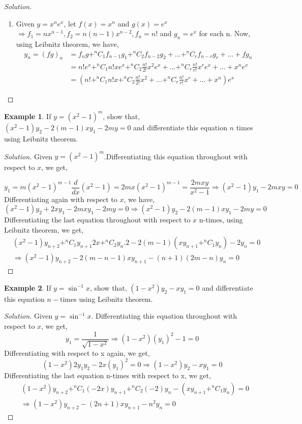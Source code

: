 \documentclass[../../main.tex]{subfiles}
\theoremstyle{definition}
\newtheorem{example}{Example}[section]
\newenvironment{solution}
    {\begin{proof}[Solution]}
    {\end{proof}}
\begin{document}
\begin{solution}
\begin{enumerate}[label=(\roman*)]
\item Given $y=x^ne^x$, let $f(x)=x^n$ and $g(x)=e^x$ $\Rightarrow f_1=nx^{n-1}, f_2=n(n-1)x^{n-2}, f_n=n!$ and $g_n=e^x$ for each n. Now, using Leibnitz theorem, we have,
\begin{align*}
y_n = (fg)_n &= f_ng+^nC_1f_{n-1}g_1+^nC_2f_{n-2}g_2+...+^nC_rf_{n-r}g_r+...+fg_n \\
&= n!e^x+^nC_1n!xe^x+^nC_2\frac{n!}{2!}x^2e^x+...+^nC_r\frac{n!}{r!}x^re^x+...+x^ne^x \\
&= (n!+^nC_1n!x+^nC_2\frac{n!}{2!}x^2+...+^nC_r\frac{n!}{r!}x^r+...+x^n)e^x
\end{align*}
\end{enumerate}
\end{solution}


\begin{example}
If $y=(x^2-1)^m$, show that, $(x^2-1)y_2-2(m-1)xy_1-2my=0$ and differentiate this equation $n$ times using Leibnitz theorem.
\end{example}

\begin{solution}
Given $y=(x^2-1)^m$.Differentiating this equation throughout with respect to $x$, we get,

\[
y_1=m(x^2-1)^{m-1}\dfrac{d}{dx}(x^2-1)=2mx(x^2-1)^{m-1}=\frac{2mxy}{x^2-1} \Rightarrow (x^2-1)y_1-2mxy=0
\]
Differentiating again with respect to $x$, we have, 
\[
(x^2-1)y_2+2xy_1-2mxy_1-2my=0 \Rightarrow (x^2-1)y_2-2(m-1)xy_1-2my=0
\]
Differentiating the last equation throughout with respect to $x$ n-times, using Leibnitz theorem, we get,
\begin{align*}
& (x^2-1)y_{n+2}+^nC_1y_{n+1}2x+^nC_2y_n.2-2(m-1)(xy_{n+1}+^nC_1y_n)-2y_n=0    \\
& \Rightarrow (x^2-1)y_{n+2}-2(m-n-1)xy_{n+1}-(n+1)(2m-n)y_n=0
\end{align*}
\end{solution}

\begin{example}
If $y=\sin^{-1}x$, show that, $(1-x^2)y_2-xy_1=0$ and differentiate this equation $n-$times using Leibnitz theorem.
\end{example}

\begin{solution}
Given $y=\sin^{-1} x$. Differentiating this equation throughout with respect to $x$, we get,
\[
y_1=\frac{1}{\sqrt{1-x^2}}\Rightarrow (1-x^2)(y_1)^2-1=0
\]
Differentiating with respect to x again, we get,
\[
(1-x^2)2y_1y_2-2x(y_1)^2=0\Rightarrow (1-x^2)y_2-xy_1=0
\]
Differentiating the last equation n-times with respect to x, we get,
\begin{align*}
& (1-x^2)y_{n+2}+^nC_1(-2x)y_{n+1}+^nC_2(-2)y_n-(xy_{n+1}+^nC_1y_n)=0 \\ 
&\Rightarrow (1-x^2)y_{n+2}-(2n+1)xy_{n+1}-n^2y_n=0
\end{align*}
\end{solution}
\end{document}
